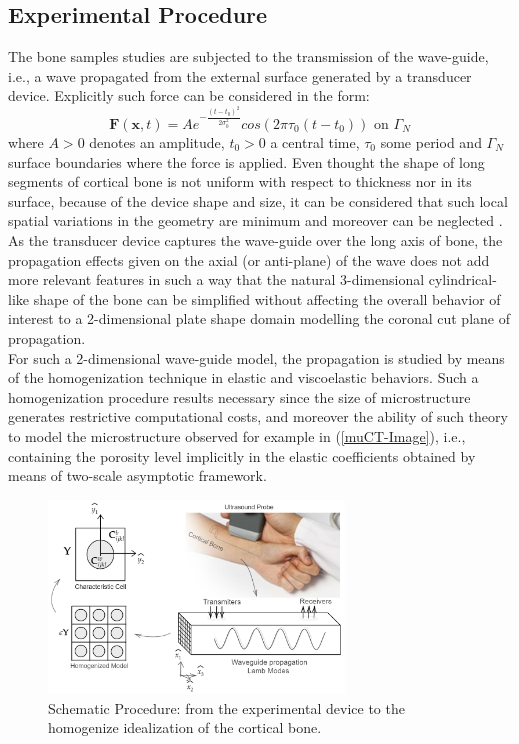 \subsection{Experimental Procedure}
The bone samples studies are subjected to the transmission of the wave-guide, i.e., a wave propagated from the external surface generated by a transducer device. 
Explicitly such force can be considered in the form:
\begin{equation*}
    \mathbf{F}(\mathbf{x},t) = A e^{-\frac{(t-t_0)^2}{2\sigma_0^2}} cos(2 \pi \tau_0 (t-t_0)) \text{ on } \Gamma_N
\end{equation*}
where $A > 0$ denotes an amplitude, $t_0 > 0$ a central time, $\tau_0$ some period and $\Gamma_N$ surface boundaries where the force is applied.
Even thought the shape of long segments of cortical bone is not uniform with respect to thickness nor in its surface, because of the device shape and size, it can be considered that such local spatial variations in the geometry are minimum and moreover can be neglected \cite{Foiret2014}. \\

As the transducer device captures the wave-guide over the long axis of bone, the propagation effects given on the axial (or anti-plane) of the wave does not add more relevant features in such a way that the natural 3-dimensional cylindrical-like shape of the bone can be simplified without affecting the overall behavior of interest to a 2-dimensional plate shape domain modelling the coronal cut plane of propagation. \\
For such a 2-dimensional wave-guide model, the propagation is studied by means of the homogenization technique in elastic and viscoelastic behaviors. Such a homogenization procedure results necessary since the size of microstructure generates restrictive computational costs, and moreover the ability of such theory to model the microstructure observed for example in (\ref{muCT-Image}), i.e., containing the porosity level implicitly in the elastic coefficients obtained by means of two-scale asymptotic framework.


\begin{figure}[!h]
	\centering
	\includegraphics[width=0.7\textwidth]{images/ImgExt/SchematicPropagation.png}
	\caption{Schematic Procedure: from the experimental device to the homogenize idealization of the cortical bone.}
	\label{SchematicProp&Hom}
\end{figure} 


